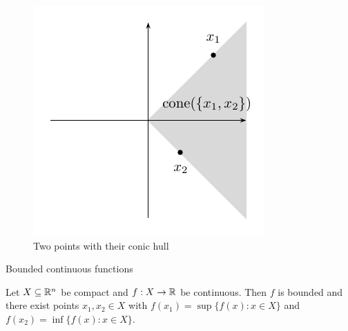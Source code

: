 \begin{frame}
  

\begin{figure}[htbp]
  \begin{center}{
   \includegraphics{../figures/picture3.pdf}

    }
    
  \end{center}
  \caption{Two points with their conic hull}\label{conv:fig:4}
\end{figure}

\end{frame}

\begin{frame}{Bounded continuous functions}

\begin{theorem}

  Let $X\subseteq\mathbb{R}^n$ be compact and $f: X \to \mathbb{R}$ be continuous. Then $f$ is
  bounded and there exist
  points $x_1,x_2 \in X$ with $f(x_1) = \sup\{ f(x) \colon  x \in X\}$ and
  $f(x_2) = \inf \{ f(x) \colon x \in X\}$. 
\end{theorem}
  
  \begin{columns}
    \begin{column}{.5\textwidth}
      
    \end{column}
    \begin{column}{.5\textwidth}
      
    \end{column}       
  \end{columns}
\end{frame}



